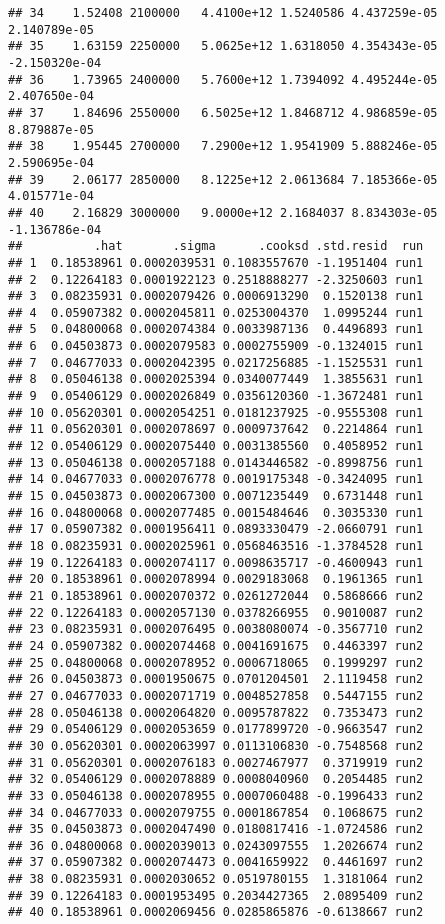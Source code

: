 \documentclass[]{book}
\theoremstyle{definition}
\theoremstyle{definition}
\theoremstyle{definition}
\theoremstyle{remark}
\begin{document}
\begin{verbatim}
## 34    1.52408 2100000   4.4100e+12 1.5240586 4.437259e-05  2.140789e-05
## 35    1.63159 2250000   5.0625e+12 1.6318050 4.354343e-05 -2.150320e-04
## 36    1.73965 2400000   5.7600e+12 1.7394092 4.495244e-05  2.407650e-04
## 37    1.84696 2550000   6.5025e+12 1.8468712 4.986859e-05  8.879887e-05
## 38    1.95445 2700000   7.2900e+12 1.9541909 5.888246e-05  2.590695e-04
## 39    2.06177 2850000   8.1225e+12 2.0613684 7.185366e-05  4.015771e-04
## 40    2.16829 3000000   9.0000e+12 2.1684037 8.834303e-05 -1.136786e-04
##          .hat       .sigma      .cooksd .std.resid  run
## 1  0.18538961 0.0002039531 0.1083557670 -1.1951404 run1
## 2  0.12264183 0.0001922123 0.2518888277 -2.3250603 run1
## 3  0.08235931 0.0002079426 0.0006913290  0.1520138 run1
## 4  0.05907382 0.0002045811 0.0253004370  1.0995244 run1
## 5  0.04800068 0.0002074384 0.0033987136  0.4496893 run1
## 6  0.04503873 0.0002079583 0.0002755909 -0.1324015 run1
## 7  0.04677033 0.0002042395 0.0217256885 -1.1525531 run1
## 8  0.05046138 0.0002025394 0.0340077449  1.3855631 run1
## 9  0.05406129 0.0002026849 0.0356120360 -1.3672481 run1
## 10 0.05620301 0.0002054251 0.0181237925 -0.9555308 run1
## 11 0.05620301 0.0002078697 0.0009737642  0.2214864 run1
## 12 0.05406129 0.0002075440 0.0031385560  0.4058952 run1
## 13 0.05046138 0.0002057188 0.0143446582 -0.8998756 run1
## 14 0.04677033 0.0002076778 0.0019175348 -0.3424095 run1
## 15 0.04503873 0.0002067300 0.0071235449  0.6731448 run1
## 16 0.04800068 0.0002077485 0.0015484646  0.3035330 run1
## 17 0.05907382 0.0001956411 0.0893330479 -2.0660791 run1
## 18 0.08235931 0.0002025961 0.0568463516 -1.3784528 run1
## 19 0.12264183 0.0002074117 0.0098635717 -0.4600943 run1
## 20 0.18538961 0.0002078994 0.0029183068  0.1961365 run1
## 21 0.18538961 0.0002070372 0.0261272044  0.5868666 run2
## 22 0.12264183 0.0002057130 0.0378266955  0.9010087 run2
## 23 0.08235931 0.0002076495 0.0038080074 -0.3567710 run2
## 24 0.05907382 0.0002074468 0.0041691675  0.4463397 run2
## 25 0.04800068 0.0002078952 0.0006718065  0.1999297 run2
## 26 0.04503873 0.0001950675 0.0701204501  2.1119458 run2
## 27 0.04677033 0.0002071719 0.0048527858  0.5447155 run2
## 28 0.05046138 0.0002064820 0.0095787822  0.7353473 run2
## 29 0.05406129 0.0002053659 0.0177899720 -0.9663547 run2
## 30 0.05620301 0.0002063997 0.0113106830 -0.7548568 run2
## 31 0.05620301 0.0002076183 0.0027467977  0.3719919 run2
## 32 0.05406129 0.0002078889 0.0008040960  0.2054485 run2
## 33 0.05046138 0.0002078955 0.0007060488 -0.1996433 run2
## 34 0.04677033 0.0002079755 0.0001867854  0.1068675 run2
## 35 0.04503873 0.0002047490 0.0180817416 -1.0724586 run2
## 36 0.04800068 0.0002039013 0.0243097555  1.2026674 run2
## 37 0.05907382 0.0002074473 0.0041659922  0.4461697 run2
## 38 0.08235931 0.0002030652 0.0519780155  1.3181064 run2
## 39 0.12264183 0.0001953495 0.2034427365  2.0895409 run2
## 40 0.18538961 0.0002069456 0.0285865876 -0.6138667 run2
\end{verbatim}
\end{document}

